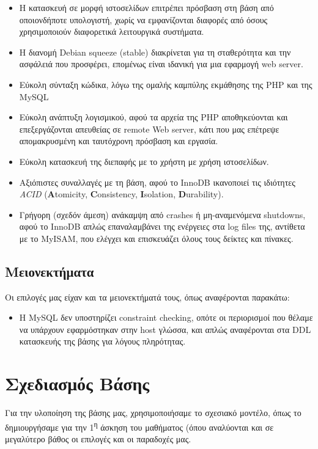 \documentclass[a4paper]{article}
\begin{document}
\begin{itemize}
\item Η κατασκευή σε μορφή ιστοσελίδων επιτρέπει πρόσβαση στη βάση από
οποιονδήποτε υπολογιστή, χωρίς να εμφανίζονται διαφορές από όσους
χρησιμοποιούν διαφορετικά λειτουργικά συστήματα.
\item Η διανομή Debian squeeze (stable) διακρίνεται για τη σταθερότητα και την
ασφάλειά που προσφέρει, επομένως είναι ιδανική για μια εφαρμογή web server.
\item Εύκολη σύνταξη κώδικα, λόγω της ομαλής καμπύλης εκμάθησης της PHP και της
MySQL
\item Εύκολη ανάπτυξη λογισμικού, αφού τα αρχεία της PHP αποθηκεύονται
και επεξεργάζονται απευθείας σε remote Web server, κάτι που μας επέτρεψε
απομακρυσμένη και ταυτόχρονη πρόσβαση και εργασία.
\item Εύκολη κατασκευή της διεπαφής με το χρήστη με χρήση ιστοσελίδων.
\item Αξιόπιστες συναλλαγές με τη βάση, αφού το InnoDB ικανοποιεί τις ιδιότητες
\emph{ACID} (\textbf{A}tomicity, \textbf{C}onsistency, \textbf{I}solation,
\textbf{D}urability).
\item Γρήγορη (σχεδόν άμεση) ανάκαμψη από crashes ή μη-αναμενόμενα shutdowns,
αφού το InnoDB απλώς επαναλαμβάνει της ενέργειες στα log files της, αντίθετα με
το MyISAM, που ελέγχει και επισκευάζει όλους τους δείκτες και πίνακες.
\end{itemize}

\subsection{Μειονεκτήματα}
Οι επιλογές μας είχαν και τα μειονεκτήματά τους, όπως αναφέρονται παρακάτω:

\begin{itemize}
\item Η MySQL δεν υποστηρίζει constraint checking, οπότε οι περιορισμοί που
θέλαμε να υπάρχουν εφαρμόστηκαν στην host γλώσσα, και απλώς αναφέρονται στα
DDL κατασκευής της βάσης για λόγους πληρότητας.
\end{itemize}



\section{Σχεδιασμός Βάσης}

Για την υλοποίηση της βάσης μας, χρησιμοποιήσαμε το σχεσιακό μοντέλο, όπως το
δημιουργήσαμε για την 1\textsuperscript{η} άσκηση του μαθήματος (όπου
αναλύονται και σε μεγαλύτερο βάθος οι επιλογές και οι παραδοχές μας.
\end{document}
